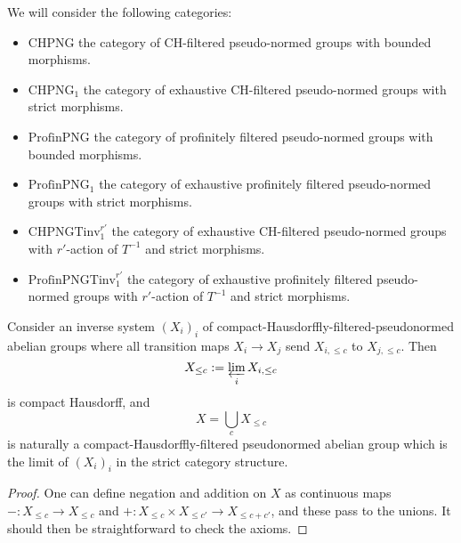 \begin{definition}
  \label{png-cats}
  We will consider the following categories:
  \begin{itemize}
    \item $\text{CHPNG}$ the category of CH-filtered pseudo-normed groups with bounded morphisms.
    \item $\text{CHPNG}_1$ the category of exhaustive CH-filtered pseudo-normed groups with strict morphisms.
    \item $\text{ProfinPNG}$ the category of profinitely filtered pseudo-normed groups with bounded morphisms.
    \item $\text{ProfinPNG}_1$ the category of exhaustive profinitely filtered pseudo-normed groups with strict morphisms.
    \item $\text{CHPNGTinv}_1^{r'}$ the category of exhaustive CH-filtered pseudo-normed groups with $r'$-action of $T^{-1}$ and strict morphisms.
    \item $\text{ProfinPNGTinv}_1^{r'}$ the category of exhaustive profinitely filtered pseudo-normed groups with $r'$-action of $T^{-1}$ and strict morphisms.
  \end{itemize}
\end{definition}

\begin{proposition}
  \label{bounded-limits}
  \leanok
  Consider an inverse system $(X_i)_i$ of compact-Hausdorffly-filtered-pseudonormed abelian groups
  where all transition maps $X_i\to X_j$ send $X_{i,\leq c}$ to $X_{j,\leq c}$.
  Then
  \[ X_{\leq c} := \varprojlim_i X_{i,\leq c} \]
  is compact Hausdorff, and
  \[ X=\bigcup_c X_{\leq c} \]
  is naturally a compact-Hausdorffly-filtered pseudonormed abelian group
  which is the limit of $(X_i)_i$ in the strict category structure.
\end{proposition}

\begin{proof}
  One can define negation and addition on $X$ as continuous maps
  $-: X_{\leq c}\to X_{\leq c}$ and $+: X_{\leq c}\times X_{\leq c'}\to X_{\leq c+c'}$, and these pass to the unions.
  It should then be straightforward to check the axioms.
\end{proof}

